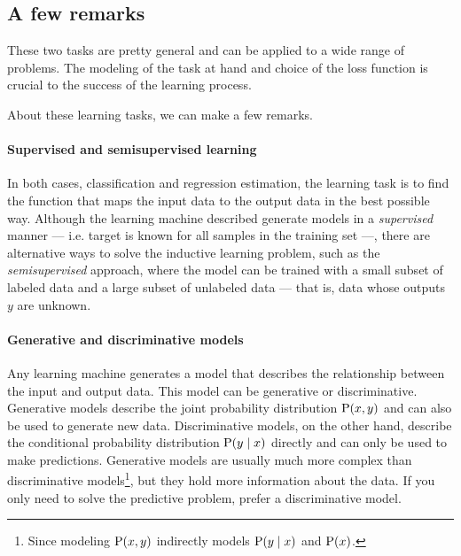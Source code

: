 \subsection{A few remarks}

These two tasks are pretty general and can be applied to a wide range of problems.  The
modeling of the task at hand and choice of the loss function is crucial to the success of
the learning process.

About these learning tasks, we can make a few remarks.

\paragraph{Supervised and semisupervised learning}
In both cases, classification and regression estimation, the learning task is to find the function
that maps the input data to the output data in the best possible way.  Although the
learning machine described generate models in a \emph{supervised} manner --- i.e. target
is known for all samples in the training set ---, there are
alternative ways to solve the inductive learning problem, such as the \emph{semisupervised}
approach, where the model can be trained with a small subset of labeled data and a large
subset of unlabeled data --- that is, data whose outputs $y$ are unknown.

\paragraph{Generative and discriminative models}
Any learning machine generates a model that describes the relationship between the input
and output data.  This model can be generative or discriminative.  Generative models
describe the joint probability distribution $\operatorname{P}(x, y)$ and can also be used to generate new
data.  Discriminative models, on the other hand, describe the conditional probability
distribution $\operatorname{P}(y \mid x)$ directly and can only be used to make predictions. Generative models are
usually much more complex than discriminative models\footnote{Since modeling $\operatorname{P}(x, y)$
indirectly models $\operatorname{P}(y \mid x)$ and $\operatorname{P}(x)$.}, but they hold more information about
the data.  If you only
need to solve the predictive problem, prefer a discriminative model.

